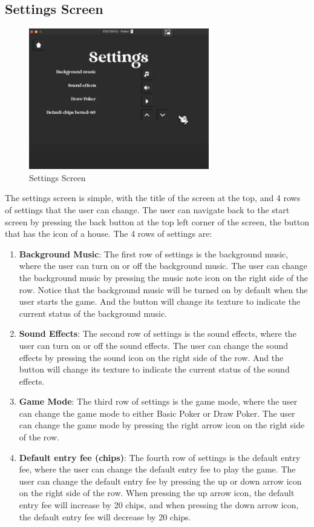 \subsection{Settings Screen}
\label{subsec:settings-screen}

\begin{figure}[H]
    \centering
    \includegraphics[width=0.7\textwidth]{figures/settings_screen.png}
    \caption{Settings Screen}
    \label{fig:settings-screen}
\end{figure}

\hspace{1cm} The settings screen is simple, with the title of the screen at the top, and 4 rows of settings that the user can change. The user can navigate back to the start screen by pressing the back button at the top left corner of the screen, the button that has the icon of a house. The 4 rows of settings are:
\begin{enumerate}
    \item \textbf{Background Music}: The first row of settings is the background music, where the user can turn on or off the background music. The user can change the background music by pressing the music note icon on the right side of the row. Notice that the background music will be turned on by default when the user starts the game. And the button will change its texture to indicate the current status of the background music.
    \item \textbf{Sound Effects}: The second row of settings is the sound effects, where the user can turn on or off the sound effects. The user can change the sound effects by pressing the sound icon on the right side of the row. And the button will change its texture to indicate the current status of the sound effects.
    \item \textbf{Game Mode}: The third row of settings is the game mode, where the user can change the game mode to either Basic Poker or Draw Poker. The user can change the game mode by pressing the right arrow icon on the right side of the row.
    \item \textbf{Default entry fee (chips)}: The fourth row of settings is the default entry fee, where the user can change the default entry fee to play the game. The user can change the default entry fee by pressing the up or down arrow icon on the right side of the row. When pressing the up arrow icon, the default entry fee will increase by 20 chips, and when pressing the down arrow icon, the default entry fee will decrease by 20 chips.
\end{enumerate}

